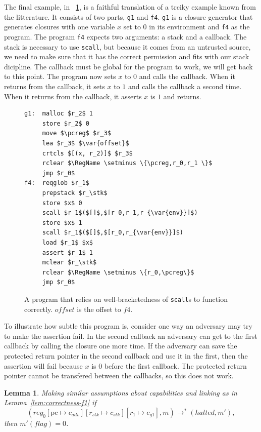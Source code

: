 \documentclass[compsoc,conference,letterpaper,fleqn]{IEEEtran}
\newtheorem{lemma}{Lemma}
\newcommand{\update}[2]{[#1 \mapsto #2]}
\newcommand{\var}[1]{\mathit{#1}}
\newcommand{\pcreg}{\mathrm{pc}}
\newcommand{\reg}{\var{reg}}
\newcommand{\adv}{\var{adv}}
\newcommand{\stk}{\var{stk}}
\newcommand{\flag}{\var{flag}}
\newcommand{\halted}{\mathit{halted}}
\newcommand{\plaindom}[1]{\mathrm{#1}}
\newcommand{\RegName}{\plaindom{RegName}}
\newcommand{\step}[1][]{\rightarrow_{#1}}
\begin{document}
The final example, in \figurename~\ref{fig:prog-g1}, is a faithful
translation of a trciky example known from the
litterature\cite{XXX}. It consists of two parts, \texttt{g1} and
\texttt{f4}. \texttt{g1} is a closure generator that generates
closures with one variable $x$ set to $0$ in its environment and
\texttt{f4} as the program. The program \texttt{f4} expects two
arguments: a stack and a callback. The stack is necessary to use
\texttt{scall}, but because it comes from an untrusted source, we need
to make sure that it has the correct permission and fits with our
stack dicipline. The callback must be global for the program to work,
we will get back to this point. The program now sets $x$ to $0$ and
calls the callback. When it returns from the callback, it sets $x$ to
$1$ and calls the callback a second time. When it returns from the
callback, it asserts $x$ is $1$ and returns.

\begin{figure}[htbp]
  \centering
  \begin{lstlisting}
g1:  malloc $r_2$ 1
     store $r_2$ 0
     move $\pcreg$ $r_3$
     lea $r_3$ $\var{offset}$
     crtcls $[(x, r_2)]$ $r_3$
     rclear $\RegName \setminus \{\pcreg,r_0,r_1 \}$
     jmp $r_0$
f4:  reqglob $r_1$
     prepstack $r_\stk$
     store $x$ 0
     scall $r_1$($[]$,$[r_0,r_1,r_{\var{env}}]$)
     store $x$ 1
     scall $r_1$($[]$,$[r_0,r_{\var{env}}]$)
     load $r_1$ $x$
     assert $r_1$ 1
     mclear $r_\stk$
     rclear $\RegName \setminus \{r_0,\pcreg\}$
     jmp $r_0$
\end{lstlisting}
  \caption{A program that relies on well-bracketedness of
    \texttt{scall}s to function correctly. $\var{offset}$ is the
    offset to $f4$.}
  \label{fig:prog-g1}
\end{figure}

To illustrate how subtle this program is, consider one way an
adversary may try to make the assertion fail. In the second callback
an adversary can get to the first callback by calling the closure one
more time. If the adversary can save the protected return pointer in
the second callback and use it in the first, then the assertion will
fail because $x$ is $0$ before the first callback. The protected return
pointer cannot be transfered between the callbacks, so this does not
work.

\begin{lemma}
  \label{lem:correctness-g1}
  Making similar assumptions about capabilities and linking as in
  Lemma~\ref{lem:correctness-f1} 
  if
  \[
  (\reg_0\update{\pcreg}{c_\adv}\update{r_\stk}{c_\stk}\update{r_1}{c_{g1}},m) \step^* (\halted,m'),
  \]
  then $m'(\flag) = 0$.
\end{lemma}
\end{document}
